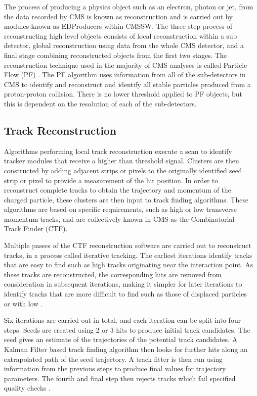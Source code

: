 The process of producing a physics object such as an electron, photon or jet, from the data recorded by CMS is
known as reconstruction and is carried out by modules known as EDProducers within CMSSW. The three-step
process of reconstructing high level objects consists of local reconstruction within a sub detector, global
reconstruction using data from the whole CMS detector, and a final stage combining reconstructed objects from
the first two stages. The reconstruction technique used in the majority of CMS analyses is called Particle
Flow (PF) \cite{particle_flow}. The PF algorithm uses information from all of the sub-detectors in CMS to
identify and reconstruct and identify all stable particles produced from a proton-proton collision. There is
no lower threshold applied to PF objects, but this is dependent on the resolution of each of the
sub-detectors.

\subsection{Track Reconstruction}
\label{ss:track_reconstruction}
Algorithms performing local track reconstruction execute a scan to identify tracker modules that receive a
higher than threshold signal. Clusters are then constructed by adding adjacent strips or pixels to the
originally identified seed strip or pixel to provide a measurement of the hit position. In order to
reconstruct complete tracks to obtain the trajectory and momentum of the charged particle, these clusters are
then input to track finding algorithms. These algorithms are based on specific requirements, such as high or
low transverse momentum tracks, and are collectively known in CMS as the Combinatorial Track Finder (CTF).

Multiple passes of the CTF reconstruction software are carried out to reconstruct tracks, in a process called
iterative tracking. The earliest iterations identify tracks that are easy to find such as high \pt tracks
originating near the interaction point. As these tracks are reconstructed, the corresponding hits are removed
from consideration in subsequent iterations, making it simpler for later iterations to identify tracks that
are more difficult to find such as those of displaced particles or with low \pt.

Six iterations are carried out in total, and each iteration can be split into four steps. Seeds are created
using 2 or 3 hits to produce initial track candidates. The seed gives an estimate of the trajectories of the
potential track candidates. A Kalman Filter \cite{kalman_filter, Speer:927395} based track finding algorithm
then looks for further hits along an extrapolated path of the seed trajectory. A track fitter is then run
using information from the previous steps to produce final values for trajectory parameters. The fourth and
final step then rejects tracks which fail specified quality checks \cite{track_reconstruction}.

